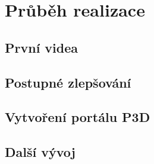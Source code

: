 \chapter{Průběh realizace}

\section*{První videa}

\section*{Postupné zlepšování}

\section*{Vytvoření portálu P3D}

\section*{Další vývoj}